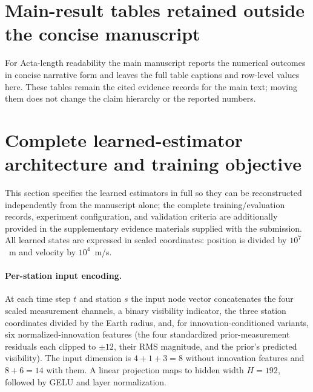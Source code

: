 \documentclass{article}
\begin{document}
\section{Main-result tables retained outside the concise manuscript}
\label{app:main-result-tables}
For Acta-length readability the main manuscript reports the numerical outcomes in concise narrative form and leaves the full table captions and row-level values here. These tables remain the cited evidence records for the main text; moving them does not change the claim hierarchy or the reported numbers.
















\section{Complete learned-estimator architecture and training objective}
\label{app:architecture}
This section specifies the learned estimators in full so they can be reconstructed independently from the manuscript alone; the complete training/evaluation records, experiment configuration, and validation criteria are additionally provided in the supplementary evidence materials supplied with the submission. All learned states are expressed in scaled coordinates: position is divided by \(10^{7}\)~m and velocity by \(10^{4}\)~m/s.

\paragraph{Per-station input encoding.}
At each time step \(t\) and station \(s\) the input node vector concatenates the four scaled measurement channels, a binary visibility indicator, the three station coordinates divided by the Earth radius, and, for innovation-conditioned variants, six normalized-innovation features (the four standardized prior-measurement residuals each clipped to \(\pm 12\), their RMS magnitude, and the prior's predicted visibility). The input dimension is \(4+1+3=8\) without innovation features and \(8+6=14\) with them. A linear projection maps to hidden width \(H=192\), followed by GELU and layer normalization.
\end{document}
